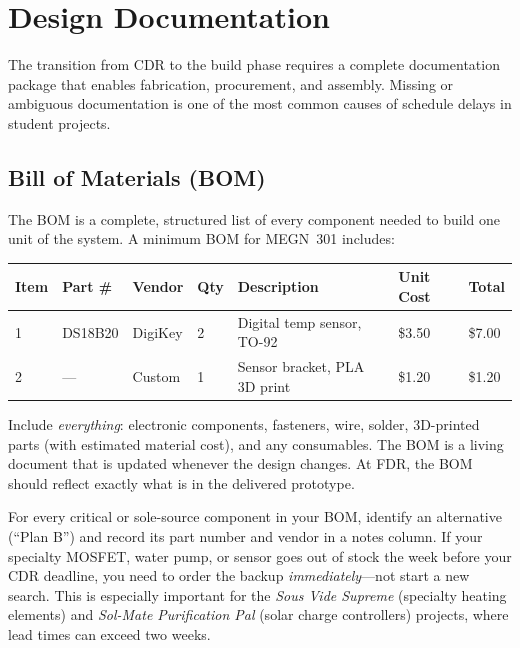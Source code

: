 \documentclass[11pt,letterpaper,twoside,openany]{book}
\begin{document}
\FloatBarrier
\section{Design Documentation}
The transition from CDR to the build phase requires a complete documentation package that enables fabrication, procurement, and assembly. Missing or ambiguous documentation is one of the most common causes of schedule delays in student projects.

\subsection{Bill of Materials (BOM)}
The BOM is a complete, structured list of every component needed to build one unit of the system. A minimum BOM for MEGN~301 includes:

\begin{center}
\small
\begin{tabularx}{\textwidth}{l l l l X l l}
\toprule
\textbf{Item} & \textbf{Part \#} & \textbf{Vendor} & \textbf{Qty} & \textbf{Description} & \textbf{Unit Cost} & \textbf{Total} \\
\midrule
1 & DS18B20 & DigiKey & 2 & Digital temp sensor, TO-92 & \$3.50 & \$7.00 \\
2 & --- & Custom & 1 & Sensor bracket, PLA 3D print & \$1.20 & \$1.20 \\
\bottomrule
\end{tabularx}
\end{center}

Include \emph{everything}: electronic components, fasteners, wire, solder, 3D-printed parts (with estimated material cost), and any consumables. The BOM is a living document that is updated whenever the design changes. At FDR, the BOM should reflect exactly what is in the delivered prototype.

\begin{tipbox}
For every critical or sole-source component in your BOM, identify an alternative (``Plan B'') and record its part number and vendor in a notes column. If your specialty MOSFET, water pump, or sensor goes out of stock the week before your CDR deadline, you need to order the backup \emph{immediately}---not start a new search. This is especially important for the \textit{Sous Vide Supreme} (specialty heating elements) and \textit{Sol-Mate Purification Pal} (solar charge controllers) projects, where lead times can exceed two weeks.
\end{tipbox}
\end{document}
